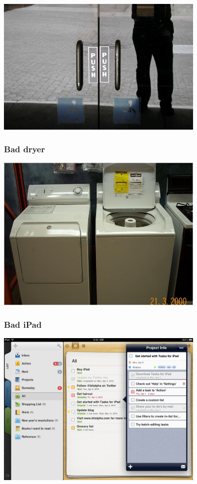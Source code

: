 \begin{center}
  \includegraphics[width=4.0in]{fiAffordBig.jpg}
\end{center}

\hypertarget{bad-dryer}{%
\subsubsection{Bad dryer}\label{bad-dryer}}

\begin{center}
  \includegraphics[width=4.0in]{fiAffordance.jpg}
\end{center}

\hypertarget{bad-ipad}{%
\subsubsection{Bad iPad}\label{bad-ipad}}

\begin{center}
  \includegraphics[width=4.0in]{fiNiceIpad1.png}
\end{center}

